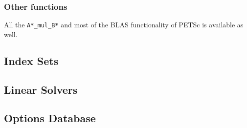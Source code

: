 \documentclass{article}
\newcommand{\ttt}{\texttt}
\begin{document}
\subsubsection{Other functions}
All the \ttt{A*\_mul\_B*} and most of the BLAS functionality of PETSc is available as well.

\subsection{Index Sets} \label{sec:is}

\subsection{Linear Solvers} \label{sec:ksp}

\subsection{Options Database} \label{sec:options}
\end{document}
